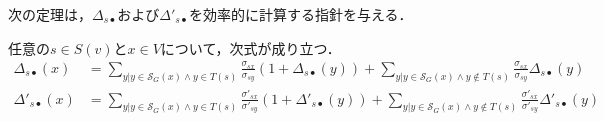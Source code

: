 次の定理は，$\Delta_{s\bullet}$および$\Delta'_{s\bullet}$を効率的に計算する指針を与える．
\begin{theorem}
  任意の$s\in S(v)$と$x\in V$について，次式が成り立つ．
  \begin{align}
    \Delta_{s\bullet}(x)
    &=\sum_{y|y\in\mathcal{S}_G(x)\land y\in T(s)}\frac{\sigma_{sx}}{\sigma_{sy}}(1+\Delta_{s\bullet}(y))
    +\sum_{y|y\in\mathcal{S}_G(x)\land y\notin T(s)}\frac{\sigma_{sx}}{\sigma_{sy}}\Delta_{s\bullet}(y)
    \label{eq:delta-dependency-1} \\
    \Delta'_{s\bullet}(x)
    &=\sum_{y|y\in\mathcal{S}_G(x)\land y\in T(s)}\frac{\sigma'_{sx}}{\sigma'_{sy}}(1+\Delta'_{s\bullet}(y))
    +\sum_{y|y\in\mathcal{S}_G(x)\land y\notin T(s)}\frac{\sigma'_{sx}}{\sigma'_{sy}}\Delta'_{s\bullet}(y)
    \label{eq:delta-dependency-2}
  \end{align}
\end{theorem}
